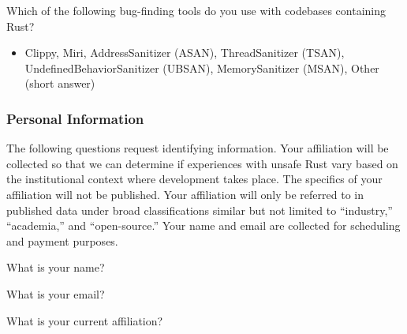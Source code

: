 \begin{protocol}
\item \label{sc:tool}  Which of the following bug-finding tools do you use with codebases containing \unsafe Rust?
    \begin{itemize}
        \item Clippy, Miri, AddressSanitizer (ASAN), ThreadSanitizer (TSAN), UndefinedBehaviorSanitizer (UBSAN), MemorySanitizer (MSAN), Other (short answer)
    \end{itemize}
\end{protocol}

\subsubsection{Personal Information}
\label{survey:personal-information}



The following questions request identifying information. Your affiliation will be collected so that we can determine if experiences with unsafe Rust vary based on the institutional context where development takes place. The specifics of your affiliation will not be published. Your affiliation will only be referred to in published data under broad classifications similar but not limited to ``industry,'' ``academia,'' and ``open-source.'' Your name and email are collected for scheduling and payment purposes.
\begin{protocol}
\item \label{sc:name}  What is your name?
\item \label{sc:email}  What is your email?
\item \label{sc:affiliation}  What is your current affiliation?
\end{protocol}
